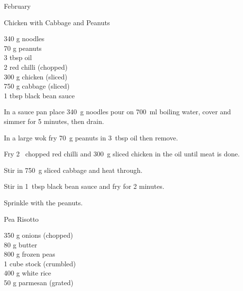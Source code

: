 \begin{menu}{February}
    \begin{recipe}{2}{Chicken with Cabbage and Peanuts}%
		\begin{ingredients}
		340 g noodles  \\
	70 g peanuts  \\
	3 tbsp oil  \\
	2  red chilli (chopped) \\
	300 g chicken (sliced) \\
	750 g cabbage (sliced) \\
	1 tbsp black bean sauce  \\
	
		\end{ingredients}
	
	
    \begin{instructions}
    \item 
    In a
    sauce pan
    place
    340~g  noodles
    pour on
    700~ml  boiling water,
    cover and simmer for 5 minutes, then drain.
  \item 
        In a large wok	fry
        70~g  peanuts
        in
        3~tbsp  oil
        then remove.
      \item 
        Fry 2~ chopped red chilli
        and
        300~g sliced chicken
        in the oil until meat is done.
      \item 
        Stir in
        750~g sliced cabbage
        and heat through.
      \item 
        Stir in
        1~tbsp  black bean sauce
        and fry for 2 minutes.
      \item 
        Sprinkle with the peanuts.
      
    \end{instructions}
    \end{recipe}%
  
    \begin{recipe}{2}{Pea Risotto}%
		\begin{ingredients}
		350 g onions (chopped) \\
	80 g butter  \\
	800 g frozen peas  \\
	1 cube stock (crumbled) \\
	400 g white rice  \\
	50 g parmesan (grated) \\
	
		\end{ingredients}
	

\end{recipe}
\end{menu}
